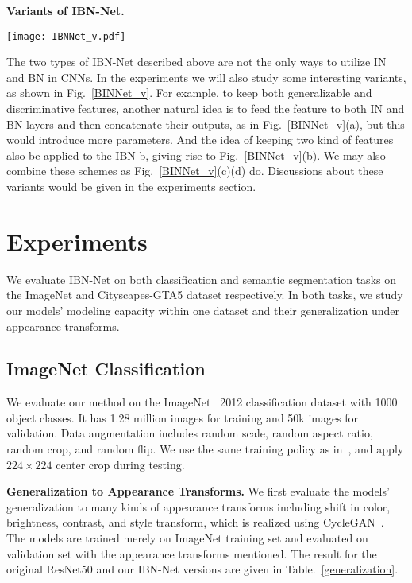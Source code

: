 \documentclass[runningheads]{llncs}
\begin{document}
\textbf{Variants of IBN-Net.}

\begin{figure*}[!t]
\centering
\texttt{[image: IBNNet\_v.pdf]}
\caption{\label{BINNet_v} Variants of IBN block. }
\end{figure*}

The two types of IBN-Net described above are not the only ways to utilize IN and BN in CNNs.
In the experiments we will also study some interesting variants, as shown in Fig.~\ref{BINNet_v}.
For example, to keep both generalizable and discriminative features, another natural idea is to feed the feature to both IN and BN layers and then concatenate their outputs, as in Fig.~\ref{BINNet_v}(a), but this would introduce more parameters. 
And the idea of keeping two kind of features also be applied to the IBN-b, giving rise to Fig.~\ref{BINNet_v}(b).
We may also combine these schemes as Fig.~\ref{BINNet_v}(c)(d) do.
Discussions about these variants would be given in the experiments section.


\section{Experiments}

We evaluate IBN-Net on both classification and semantic segmentation tasks on the ImageNet and Cityscapes-GTA5 dataset respectively.
In both tasks, we study our models' modeling capacity within one dataset and their generalization under appearance transforms.

\subsection{ImageNet Classification}

We evaluate our method on the ImageNet~\cite{deng2009imagenet} 2012 classification dataset with 1000 object classes.
It has 1.28 million images for training and 50k images for validation.
Data augmentation includes random scale, random aspect ratio, random crop, and random flip.
We use the same training policy as in~\cite{gross2016training}, and apply \(224\times 224\) center crop during testing.

\textbf{Generalization to Appearance Transforms.}
We first evaluate the models' generalization to many kinds of appearance transforms including shift in color, brightness, contrast, and style transform, which is realized using CycleGAN~\cite{zhu2017unpaired}. 
The models are trained merely on ImageNet training set and evaluated on validation set with the appearance transforms mentioned.
The result for the original ResNet50 and our IBN-Net versions are given in Table.~\ref{generalization}.
\end{document}
